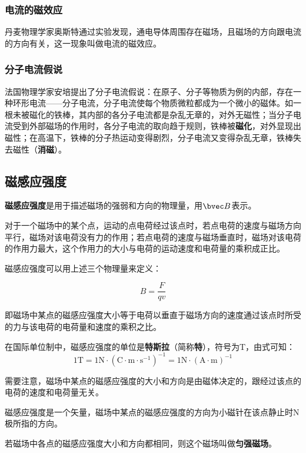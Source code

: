 \subsubsection{电流的磁效应}

丹麦物理学家奥斯特通过实验发现，通电导体周围存在磁场，且磁场的方向跟电流的方向有关，这一现象叫做电流的磁效应。

\subsubsection{分子电流假说}

法国物理学家安培提出了分子电流假说：在原子、分子等物质为例的内部，存在一种环形电流——分子电流，分子电流使每个物质微粒都成为一个微小的磁体。如一根未被磁化的铁棒，其内部的各分子电流都是杂乱无章的，对外无磁性；当分子电流受到外部磁场的作用时，各分子电流的取向趋于规则，铁棒被\textbf{磁化}，对外显现出磁性；在高温下，铁棒的分子热运动变得剧烈，分子电流又变得杂乱无章，铁棒失去磁性（\textbf{消磁}）。

\subsection{磁感应强度}

\textbf{磁感应强度}是用于描述磁场的强弱和方向的物理量，用$\bvec B$表示。

对于一个磁场中的某个点，运动的点电荷经过该点时，若点电荷的速度与磁场方向平行，磁场对该电荷没有力的作用；若点电荷的速度与磁场垂直时，磁场对该电荷的作用力最大，这个作用力的大小与电荷的运动速度和电荷量的乘积成正比。

磁感应强度可以用上述三个物理量来定义：

\begin{equation}
B=\frac{F}{qv}
\end{equation}

即磁场中某点的磁感应强度大小等于电荷以垂直于磁场方向的速度通过该点时所受的力与该电荷的电荷量和速度的乘积之比。

在国际单位制中，磁感应强度的单位是\textbf{特斯拉}（简称\textbf{特}），符号为$\mathrm{T}$，由式可知：
$$1\mathrm{T}=1\mathrm{N}\cdot ( \mathrm{C \cdot m \cdot s^{-1} } )^{-1}= 1 \mathrm{N} \cdot ( \mathrm{A} \cdot \mathrm{m})^{-1}$$

需要注意，磁场中某点的磁感应强度的大小和方向是由磁体决定的，跟经过该点的电荷的速度和电荷量无关。

磁感应强度是一个矢量，磁场中某点的磁感应强度的方向为小磁针在该点静止时$\mathrm{N}$极所指的方向。

若磁场中各点的磁感应强度大小和方向都相同，则这个磁场叫做\textbf{匀强磁场}。

